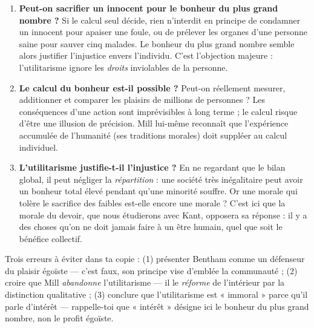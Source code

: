 \documentclass[11pt]{article}
\begin{document}
\begin{enumerate}
\item \textbf{Peut-on sacrifier un innocent pour le bonheur du plus grand nombre ?} Si le calcul seul décide, rien n'interdit en principe de condamner un innocent pour apaiser une foule, ou de prélever les organes d'une personne saine pour sauver cinq malades. Le bonheur du plus grand nombre semble alors justifier l'injustice envers l'individu. C'est l'objection majeure : l'utilitarisme ignore les \emph{droits} inviolables de la personne.
\item \textbf{Le calcul du bonheur est-il possible ?} Peut-on réellement mesurer, additionner et comparer les plaisirs de millions de personnes ? Les conséquences d'une action sont imprévisibles à long terme ; le calcul risque d'être une illusion de précision. Mill lui-même reconnaît que l'expérience accumulée de l'humanité (ses traditions morales) doit suppléer au calcul individuel.
\item \textbf{L'utilitarisme justifie-t-il l'injustice ?} En ne regardant que le bilan global, il peut négliger la \emph{répartition} : une société très inégalitaire peut avoir un bonheur total élevé pendant qu'une minorité souffre. Or une morale qui tolère le sacrifice des faibles est-elle encore une morale ? C'est ici que la morale du devoir, que nous étudierons avec Kant, opposera sa réponse : il y a des choses qu'on ne doit jamais faire à un être humain, quel que soit le bénéfice collectif.
\end{enumerate}

\begin{attention}
Trois erreurs à éviter dans ta copie : (1) présenter Bentham comme un défenseur du plaisir égoïste — c'est faux, son principe vise d'emblée la communauté ; (2) croire que Mill \emph{abandonne} l'utilitarisme — il le \emph{réforme} de l'intérieur par la distinction qualitative ; (3) conclure que l'utilitarisme est « immoral » parce qu'il parle d'intérêt — rappelle-toi que « intérêt » désigne ici le bonheur du plus grand nombre, non le profit égoïste.
\end{attention}
\end{document}
